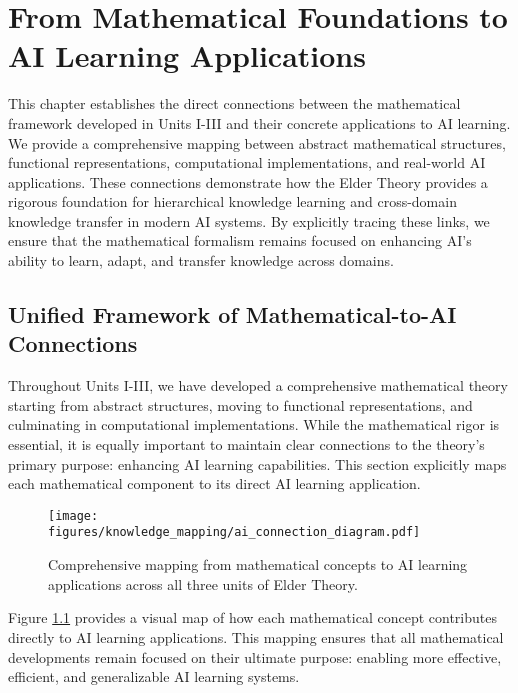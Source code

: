 \chapter{From Mathematical Foundations to AI Learning Applications}

\begin{chapterabstract}
This chapter establishes the direct connections between the mathematical framework developed in Units I-III and their concrete applications to AI learning. We provide a comprehensive mapping between abstract mathematical structures, functional representations, computational implementations, and real-world AI applications. These connections demonstrate how the Elder Theory provides a rigorous foundation for hierarchical knowledge learning and cross-domain knowledge transfer in modern AI systems. By explicitly tracing these links, we ensure that the mathematical formalism remains focused on enhancing AI's ability to learn, adapt, and transfer knowledge across domains.
\end{chapterabstract}

\section{Unified Framework of Mathematical-to-AI Connections}

Throughout Units I-III, we have developed a comprehensive mathematical theory starting from abstract structures, moving to functional representations, and culminating in computational implementations. While the mathematical rigor is essential, it is equally important to maintain clear connections to the theory's primary purpose: enhancing AI learning capabilities. This section explicitly maps each mathematical component to its direct AI learning application.

\begin{figure}[h]
\centering
\texttt{[image: figures/knowledge\_mapping/ai\_connection\_diagram.pdf]}
\caption{Comprehensive mapping from mathematical concepts to AI learning applications across all three units of Elder Theory.}
\label{fig:ai_connection_diagram}
\end{figure}

Figure \ref{fig:ai_connection_diagram} provides a visual map of how each mathematical concept contributes directly to AI learning applications. This mapping ensures that all mathematical developments remain focused on their ultimate purpose: enabling more effective, efficient, and generalizable AI learning systems.

